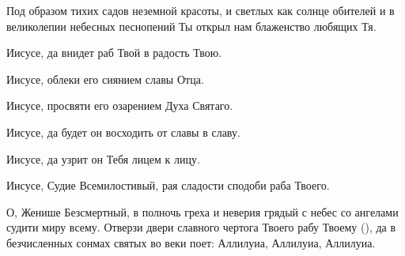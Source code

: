 \begin{mymulticols}


Под образом тихих садов неземной красоты, и светлых как солнце обителей и в великолепии небесных песнопений Ты открыл нам блаженство любящих Тя. 

Иисусе, да внидет раб Твой в радость Твою. 

Иисусе, облеки его сиянием славы Отца. 

Иисусе, просвяти его озарением Духа Святаго. 

Иисусе, да будет он восходить от славы в славу. 

Иисусе, да узрит он Тебя лицем к лицу. 

Иисусе, Судие Всемилостивый, рая сладости сподоби раба Твоего.




О, Женише Безсмертный, в полночь греха и неверия грядый с небес со ангелами судити миру всему. Отверзи двери славного чертога Твоего рабу Твоему (), да в безчисленных сонмах святых во веки поет: Аллилуиа, Аллилуиа, Аллилуиа. 


\end{mymulticols}

\mychapterending


